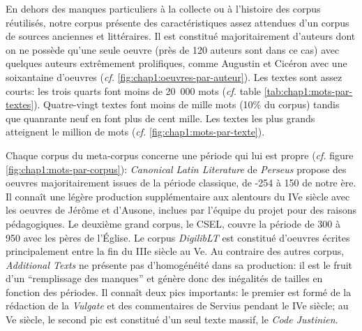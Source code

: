 En dehors des manques particuliers à la collecte ou à l'histoire des corpus réutilisés, notre corpus présente des caractéristiques assez attendues d'un corpus de sources anciennes et littéraires. Il est constitué majoritairement d'auteurs dont on ne possède qu'une seule oeuvre (près de 120 auteurs sont dans ce cas) avec quelques auteurs extrêmement prolifiques, comme Augustin et Cicéron avec une soixantaine d'oeuvres (\textit{cf.} \ref{fig:chap1:oeuvres-par-auteur}). Les textes sont assez courts: les trois quarts font moins de 20~000 mots (\textit{cf.} table \ref{tab:chap1:mots-par-textes}). Quatre-vingt textes font moins de mille mots (10\% du corpus) tandis que quanrante neuf en font plus de cent mille. Les textes les plus grands atteignent le million de mots (\textit{cf.} \ref{fig:chap1:mots-par-texte}).

Chaque corpus du meta-corpus concerne une période qui lui est propre (\textit{cf.} figure \ref{fig:chap1:mots-par-corpus}): \textit{Canonical Latin Literature} de \textit{Perseus} propose des oeuvres majoritairement issues de la période classique, de -254 à 150 de notre ère. Il connaît une légère production supplémentaire aux alentours du IVe siècle avec les oeuvres de Jérôme et d'Ausone, inclues par l'équipe du projet pour des raisons pédagogiques. Le deuxième grand corpus, le CSEL, couvre la période de 300 à 950 avec les pères de l'Église. Le corpus \textit{DigilibLT} est constitué d'oeuvres écrites principalement entre la fin du IIIe siècle au Ve. Au contraire des autres corpus, \textit{Additional Texts} ne présente pas d'homogénéité dans sa production: il est le fruit d'un \enquote{remplissage des manques} et génère donc des inégalités de tailles en fonction des périodes. Il connaît deux pics importants: le premier est formé de la rédaction de la \textit{Vulgate} et des commentaires de Servius pendant le IVe siècle; au Ve siècle, le second pic est constitué d'un seul texte massif, le \textit{Code Justinien}.

